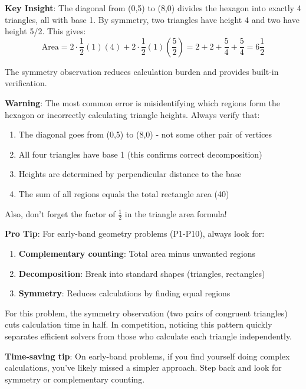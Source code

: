 \documentclass[11pt]{article}
\begin{document}
\begin{keyinsightbox}
\textbf{Key Insight}: The diagonal from (0,5) to (8,0) divides the hexagon into exactly 4 triangles, all with base 1. By symmetry, two triangles have height 4 and two have height 5/2. This gives:
$$\text{Area} = 2 \cdot \frac{1}{2}(1)(4) + 2 \cdot \frac{1}{2}(1)\left(\frac{5}{2}\right) = 2 + 2 + \frac{5}{4} + \frac{5}{4} = 6\frac{1}{2}$$

The symmetry observation reduces calculation burden and provides built-in verification.
\end{keyinsightbox}

\begin{warningbox}
\textbf{Warning}: The most common error is misidentifying which regions form the hexagon or incorrectly calculating triangle heights. Always verify that:
\begin{enumerate}
    \item The diagonal goes from (0,5) to (8,0) - not some other pair of vertices
    \item All four triangles have base 1 (this confirms correct decomposition)
    \item Heights are determined by perpendicular distance to the base
    \item The sum of all regions equals the total rectangle area (40)
\end{enumerate}

Also, don't forget the factor of $\frac{1}{2}$ in the triangle area formula!
\end{warningbox}

\begin{tipbox}
\textbf{Pro Tip}: For early-band geometry problems (P1-P10), always look for:
\begin{enumerate}
    \item \textbf{Complementary counting}: Total area minus unwanted regions
    \item \textbf{Decomposition}: Break into standard shapes (triangles, rectangles)
    \item \textbf{Symmetry}: Reduces calculations by finding equal regions
\end{enumerate}

For this problem, the symmetry observation (two pairs of congruent triangles) cuts calculation time in half. In competition, noticing this pattern quickly separates efficient solvers from those who calculate each triangle independently.

\textbf{Time-saving tip}: On early-band problems, if you find yourself doing complex calculations, you've likely missed a simpler approach. Step back and look for symmetry or complementary counting.
\end{tipbox}
\end{document}
